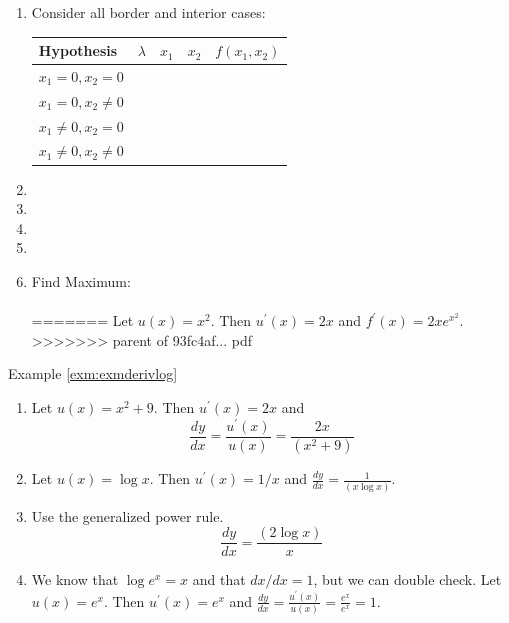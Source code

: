 \documentclass[]{book}
\providecommand{\tightlist}{%
  \setlength{\itemsep}{0pt}\setlength{\parskip}{0pt}}
\theoremstyle{definition}
\theoremstyle{definition}
\theoremstyle{definition}
\theoremstyle{remark}
\begin{document}
\begin{enumerate}
\item Consider all border and interior cases:
\begin{center}
\begin{tabular}{|l|ccc|c|}
\hline
Hypothesis  & $\lambda$& $x_1$ & $x_2$ & $f(x_1, x_2)$\\
\hline
$x_1 = 0, x_2 = 0$  &\multicolumn{3}{l|}{\phantom{No Solution}}& \\
$x_1 = 0, x_2 \neq 0$  &\multicolumn{3}{l|}{\phantom{No Solution}}& \\
$x_1 \neq 0, x_2 = 0$  & \multicolumn{3}{l|}{\phantom{No Solution}}& \\
$x_1 \neq 0, x_2 \neq 0$ &  & \phantom{$\frac{4}{3}$} & \phantom{$\frac{4}{3}$} & \phantom{$\log\frac{7}{3}$}\\
\hline
\end{tabular}
\end{center}

\item[]
\item[]
\item[]
\item[]

\item  Find Maximum:\\
\\
=======
  Let \(u(x)=x^2\). Then \(u^\prime(x)=2x\) and \(f^\prime(x)=2xe^{x^2}\).
>>>>>>> parent of 93fc4af... pdf
\end{enumerate}

Example \ref{exm:exmderivlog}

{}

\begin{enumerate}
\def\labelenumi{\arabic{enumi}.}
\tightlist
\item
  Let \(u(x)=x^2+9\). Then \(u^\prime(x)=2x\) and \[\frac{dy}{dx}= \frac{u^\prime(x)}{u(x)} = \frac{2x}{(x^2+9)}\]
\item
  Let \(u(x)=\log x\). Then \(u^\prime(x)=1/x\) and \(\frac{dy}{dx} = \frac{1}{(x\log x)}\).
\item
  Use the generalized power rule. \[\frac{dy}{dx} = \frac{(2 \log x)}{x}\]
\item
  We know that \(\log e^x=x\) and that \(dx/dx=1\), but we can double check. Let \(u(x)=e^x\). Then \(u^\prime(x)=e^x\) and \(\frac{dy}{dx} = \frac{u^\prime(x)}{u(x)} = \frac{e^x}{e^x} = 1.\)
\end{enumerate}
\end{document}
